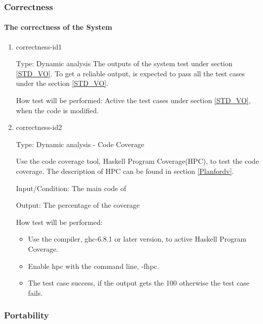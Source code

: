 \documentclass[12pt, titlepage]{article}
\begin{document}
  \subsubsection{Correctness}
\paragraph{The correctness of the System}

\begin{enumerate} 

\item{correctness-id1\\} 

Type: Dynamic analysis
The outputs of the system test under section \ref{STD_VO}. To get a
reliable output, \progname is expected to pass all the test cases under the
section \ref{STD_VO}.

How test will be performed: Active the test cases under section
\ref{STD_VO}, when the code is modified.

\item{correctness-id2\\}

Type: Dynamic analysis - Code Coverage

Use the code coverage tool, Haskell Program Coverage(HPC), to test the code
coverage. The description of HPC can be found in section \ref{Planfordv}.

Input/Condition: The main code of \progname

Output: The percentage of the coverage 

How test will be performed:

\begin{itemize} 
\item Use the compiler, ghc-6.8.1 or later version, to active Haskell Program
Coverage.
\item Enable hpc with the command line, -fhpc.
\item The test case success, if the output gets the 100%
otherwise
the test case fails. 
\end{itemize}
\end{enumerate} 


\subsubsection{Portability} 
\end{document}
